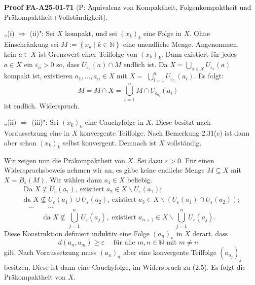 \documentclass[10pt, letterpaper]{article}
\newcommand{\CustomHeading}[3]{%
  \par\medskip\noindent%
  \textbf{#1 #2} \textnormal{(#3)}.\enskip%
}
\newenvironment{PROOF}[2]{\begin{unitbox}\CustomHeading{Proof}{#1}{#2}}{\end{unitbox}}
\begin{document}
\begin{PROOF}{FA-A25-01-71}{P: Äquivalenz von Kompaktheit, Folgenkompaktheit und Präkompaktheit+Vollständigkeit}
„(i) $\Longrightarrow$ (ii)": Sei $X$ kompakt, und sei $\left(x_{k}\right)_{k}$ eine Folge in $X$. Ohne Einschränkung sei $M:=\left\{x_{k} \mid k \in \mathbb{N}\right\}$ eine unendliche Menge. Angenommen, kein $a \in X$ ist Grenzwert einer Teilfolge von $\left(x_{k}\right)_{k}$. Dann existiert für jedes $a \in X$ ein $\varepsilon_{a}>0$ so, dass $U_{\varepsilon_{a}}(a) \cap M$ endlich ist. Da $X=\bigcup_{a \in X} U_{\varepsilon_{a}}(a)$ kompakt ist, existieren $a_{1}, \ldots, a_{n} \in X$ mit $X=$ $\bigcup_{i=1}^{n} U_{\varepsilon_{a_{i}}}\left(a_{i}\right)$. Es folgt: 
$$M=M \cap X=\bigcup_{i=1}^{n} M \cap U_{\varepsilon_{a_{i}}}\left(a_{i}\right)$$ 
ist endlich. Widerspruch.

„(ii) $\Longrightarrow$ (iii)": Sei $\left(x_{k}\right)_{k}$ eine Cauchyfolge in $X$. Diese besitzt nach Voraussetzung eine in $X$ konvergente Teilfolge. Nach Bemerkung 2.31(c) ist dann aber schon $\left(x_{k}\right)_{k}$ selbst konvergent. Demnach ist $X$ vollständig.

Wir zeigen nun die Präkompaktheit von $X$. Sei dazu $\varepsilon>0$. Für einen Widerspruchsbeweis nehmen wir an, es gäbe keine endliche Menge $M \subseteq X$ mit $X=B_{\varepsilon}(M)$. Wir wählen dann $a_{1} \in X$ beliebig.
$$
\begin{aligned}
& \text { Da } X \nsubseteq U_{\varepsilon}\left(a_{1}\right) \text {, existiert } a_{2} \in X \backslash U_{\varepsilon}\left(a_{1}\right) ; \\
& \text { da } X \nsubseteq U_{\varepsilon}\left(a_{1}\right) \cup U_{\varepsilon}\left(a_{2}\right) \text {, existiert } a_{3} \in X \backslash\left(U_{\varepsilon}\left(a_{1}\right) \cap U_{\varepsilon}\left(a_{2}\right)\right) ; \\
& \quad \ldots \quad \quad \ldots
\end{aligned}
$$
$$
\text { da } X \nsubseteq \bigcup_{j=1}^{n} U_{\varepsilon}\left(a_{j}\right), \text { existiert } a_{n+1} \in X \backslash \bigcup_{j=1}^{n} U_{\varepsilon}\left(a_{j}\right) .
$$
Diese Konstruktion definiert induktiv eine Folge $\left(a_{n}\right)_{n}$ in $X$ derart, dass
$$
d\left(a_{n}, a_{m}\right) \geq \varepsilon \quad \text { für alle } m, n \in \mathbb{N} \text { mit } m \neq n
$$
gilt. Nach Voraussetzung muss $\left(a_{n}\right)_{n}$ aber eine konvergente Teilfolge $\left(a_{n_{j}}\right)_{j}$ besitzen. Diese ist dann eine Cauchyfolge, im Widerspruch zu (2.5). Es folgt die Präkompaktheit von $X$. 


\end{PROOF}
\end{document}
